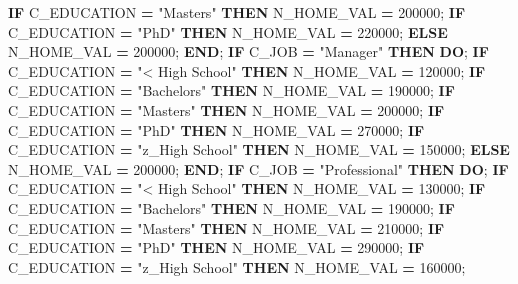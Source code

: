 \documentclass[]{article}
\newenvironment{Shaded}{\begin{snugshade}}{\end{snugshade}}
\newcommand{\KeywordTok}[1]{\textcolor[rgb]{0.13,0.29,0.53}{\textbf{{#1}}}}
\newcommand{\DecValTok}[1]{\textcolor[rgb]{0.00,0.00,0.81}{{#1}}}
\newcommand{\StringTok}[1]{\textcolor[rgb]{0.31,0.60,0.02}{{#1}}}
\newcommand{\NormalTok}[1]{{#1}}
\begin{document}
\begin{Shaded}
\begin{Highlighting}[]
            \KeywordTok{IF} \NormalTok{C_EDUCATION }\KeywordTok{=} \StringTok{"Masters"} \KeywordTok{THEN} \NormalTok{N_HOME_VAL }\KeywordTok{=} \DecValTok{200000}\NormalTok{;}
            \KeywordTok{IF} \NormalTok{C_EDUCATION }\KeywordTok{=} \StringTok{"PhD"} \KeywordTok{THEN} \NormalTok{N_HOME_VAL }\KeywordTok{=} \DecValTok{220000}\NormalTok{;}
            \KeywordTok{ELSE} \NormalTok{N_HOME_VAL }\KeywordTok{=} \DecValTok{200000}\NormalTok{;}
        \KeywordTok{END}\NormalTok{;}
        \KeywordTok{IF} \NormalTok{C_JOB }\KeywordTok{=} \StringTok{"Manager"} \KeywordTok{THEN} \KeywordTok{DO}\NormalTok{;}
            \KeywordTok{IF} \NormalTok{C_EDUCATION }\KeywordTok{=} \StringTok{"< High School"} \KeywordTok{THEN} \NormalTok{N_HOME_VAL }\KeywordTok{=} \DecValTok{120000}\NormalTok{;}
            \KeywordTok{IF} \NormalTok{C_EDUCATION }\KeywordTok{=} \StringTok{"Bachelors"} \KeywordTok{THEN} \NormalTok{N_HOME_VAL }\KeywordTok{=} \DecValTok{190000}\NormalTok{;}
            \KeywordTok{IF} \NormalTok{C_EDUCATION }\KeywordTok{=} \StringTok{"Masters"} \KeywordTok{THEN} \NormalTok{N_HOME_VAL }\KeywordTok{=} \DecValTok{200000}\NormalTok{;}
            \KeywordTok{IF} \NormalTok{C_EDUCATION }\KeywordTok{=} \StringTok{"PhD"} \KeywordTok{THEN} \NormalTok{N_HOME_VAL }\KeywordTok{=} \DecValTok{270000}\NormalTok{;}
            \KeywordTok{IF} \NormalTok{C_EDUCATION }\KeywordTok{=} \StringTok{"z_High School"} \KeywordTok{THEN} \NormalTok{N_HOME_VAL }\KeywordTok{=} \DecValTok{150000}\NormalTok{;}
            \KeywordTok{ELSE} \NormalTok{N_HOME_VAL }\KeywordTok{=} \DecValTok{200000}\NormalTok{;}
        \KeywordTok{END}\NormalTok{;}
        \KeywordTok{IF} \NormalTok{C_JOB }\KeywordTok{=} \StringTok{"Professional"} \KeywordTok{THEN} \KeywordTok{DO}\NormalTok{;}
            \KeywordTok{IF} \NormalTok{C_EDUCATION }\KeywordTok{=} \StringTok{"< High School"} \KeywordTok{THEN} \NormalTok{N_HOME_VAL }\KeywordTok{=} \DecValTok{130000}\NormalTok{;}
            \KeywordTok{IF} \NormalTok{C_EDUCATION }\KeywordTok{=} \StringTok{"Bachelors"} \KeywordTok{THEN} \NormalTok{N_HOME_VAL }\KeywordTok{=} \DecValTok{190000}\NormalTok{;}
            \KeywordTok{IF} \NormalTok{C_EDUCATION }\KeywordTok{=} \StringTok{"Masters"} \KeywordTok{THEN} \NormalTok{N_HOME_VAL }\KeywordTok{=} \DecValTok{210000}\NormalTok{;}
            \KeywordTok{IF} \NormalTok{C_EDUCATION }\KeywordTok{=} \StringTok{"PhD"} \KeywordTok{THEN} \NormalTok{N_HOME_VAL }\KeywordTok{=} \DecValTok{290000}\NormalTok{;}
            \KeywordTok{IF} \NormalTok{C_EDUCATION }\KeywordTok{=} \StringTok{"z_High School"} \KeywordTok{THEN} \NormalTok{N_HOME_VAL }\KeywordTok{=} \DecValTok{160000}\NormalTok{;}

\end{Highlighting}
\end{Shaded}
\end{document}
